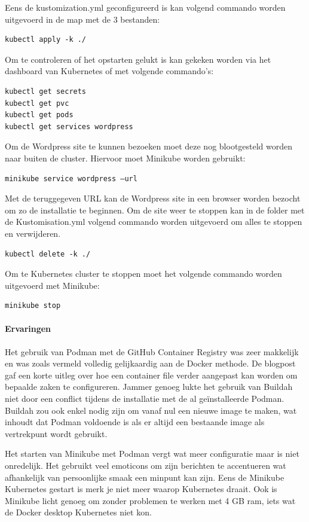 Eens de kustomization.yml geconfigureerd is kan volgend commando worden uitgevoerd in de map met de 3 bestanden:
\begin{verbatim}
kubectl apply -k ./
\end{verbatim}
Om te controleren of het opstarten gelukt is kan gekeken worden via het dashboard van Kubernetes of met volgende commando’s:
\begin{verbatim}
kubectl get secrets
kubectl get pvc
kubectl get pods
kubectl get services wordpress
\end{verbatim}
Om de Wordpress site te kunnen bezoeken moet deze nog blootgesteld worden naar buiten de cluster. Hiervoor moet Minikube worden gebruikt:
\begin{verbatim}
minikube service wordpress –url
\end{verbatim}
Met de teruggegeven URL kan de Wordpress site in een browser worden bezocht om zo de installatie te beginnen.
Om de site weer te stoppen kan in de folder met de Kustomisation.yml volgend commando worden uitgevoerd om alles te stoppen en verwijderen.
\begin{verbatim}
kubectl delete -k ./
\end{verbatim}

Om te Kubernetes cluster te stoppen moet het volgende commando worden uitgevoerd met Minikube:
\begin{verbatim}
minikube stop
\end{verbatim}

\paragraph{Ervaringen}
Het gebruik van Podman met de GitHub Container Registry was zeer makkelijk en was zoals vermeld volledig gelijkaardig aan de Docker methode. De blogpost gaf een korte uitleg over hoe een container file verder aangepast kan worden om bepaalde zaken te configureren. Jammer genoeg lukte het gebruik van Buildah niet door een conflict tijdens de installatie met de al geïnstalleerde Podman. Buildah zou ook enkel nodig zijn om vanaf nul een nieuwe image te maken, wat inhoudt dat Podman voldoende is als er altijd een bestaande image als vertrekpunt wordt gebruikt.

Het starten van Minikube met Podman vergt wat meer configuratie maar is niet onredelijk. Het gebruikt veel emoticons om zijn berichten te accentueren wat afhankelijk van persoonlijke smaak een minpunt kan zijn. Eens de Minikube Kubernetes gestart is merk je niet meer waarop Kubernetes draait. Ook is Minikube licht genoeg om zonder problemen te werken met 4 GB ram, iets wat de Docker desktop Kubernetes niet kon.


